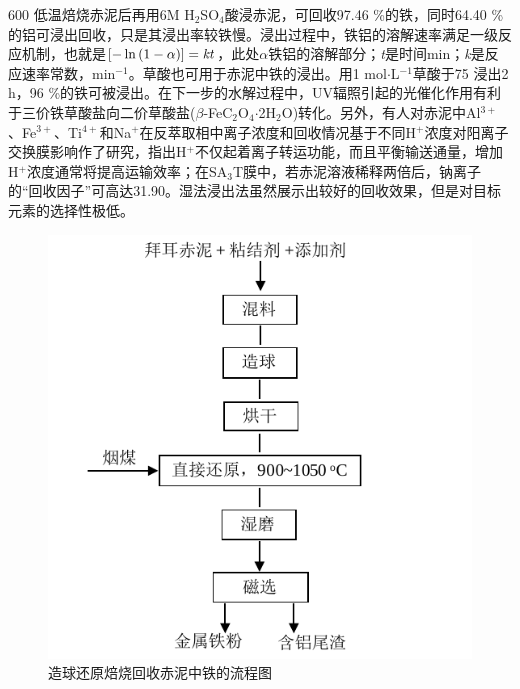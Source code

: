 600 \textcelsius 低温焙烧赤泥后再用6M H$ _{\mathrm{2}} $SO$ _{\mathrm{4}} $酸浸赤泥，可回收97.46 \%的铁，同时64.40 \%的铝可浸出回收，只是其浸出率较铁慢\cite{uzun2007dissolution}。浸出过程中，铁铝的溶解速率满足一级反应机制，也就是$\left[ {{\rm{ - }}\ln \left( {1 - \alpha } \right)} \right] = \mathit{kt}$，此处$ \alpha $铁铝的溶解部分；\textit{t}是时间min；\textit{k}是反应速率常数，min$ ^{\mathrm{-1}} $。草酸也可用于赤泥中铁的浸出\cite{yu2012red}。用1 mol$ \cdot $L$ ^{\mathrm{-1}} $草酸于75 \textcelsius 浸出2 h，96 \%的铁可被浸出。在下一步的水解过程中，UV辐照引起的光催化作用有利于三价铁草酸盐向二价草酸盐($ \beta $-FeC$ _{\mathrm{2}} $O$ _{\mathrm{4}} $$ \cdot $2H$ _{\mathrm{2}} $O)转化。另外，有人对赤泥中Al$ ^{\mathrm{3+}} $、Fe$ ^{\mathrm{3+}} $、Ti$ ^{\mathrm{4+}} $和Na$ ^{\mathrm{+}} $在反萃取相中离子浓度和回收情况基于不同H$ ^{\mathrm{+}} $浓度对阳离子交换膜影响作了研究\cite{cengeloglu2003recovery,ccengelouglu2001recovery}，指出H$ ^{\mathrm{+}} $不仅起着离子转运功能，而且平衡输送通量，增加H$ ^{\mathrm{+}} $浓度通常将提高运输效率；在SA$ _{\mathrm{3}} $T膜中，若赤泥溶液稀释两倍后，钠离子的“回收因子”可高达31.90\cite{cengeloglu2003recovery}。湿法浸出法虽然展示出较好的回收效果，但是对目标元素的选择性极低。
\begin{figure}[!h]
	\centering
	\includegraphics[width=0.65\linewidth]{Figures/c1/Figure7}
	\caption{造球还原焙烧回收赤泥中铁的流程图}\label{recoveringFe}
\end{figure}

